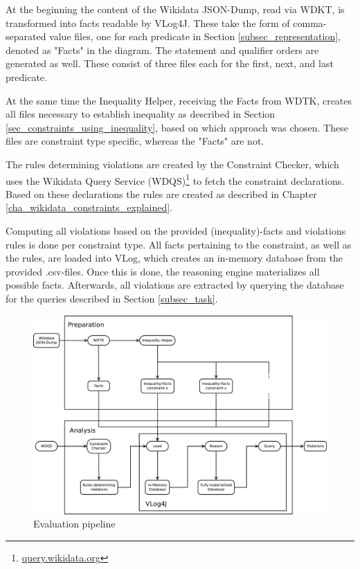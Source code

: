 \documentclass[hyperref,bachelorofscience,fleqn]{cgvpub}
\begin{document}
At the beginning the content of the Wikidata JSON-Dump, read via WDKT, is transformed into facts readable by VLog4J. These take the form of comma-separated value files, one for each predicate in Section \ref{subsec_representation}, denoted as "Facts" in the diagram. The statement and qualifier orders are generated as well. These consist of three files each for the first, next, and last predicate.

At the same time the Inequality Helper, receiving the Facts from WDTK, creates all files necessary to establish inequality as described in Section \ref{sec_constraints_using_inequality}, based on which approach was chosen. These files are constraint type specific, whereas the "Facts" are not.

The rules determining violations are created by the Constraint Checker, which uses the Wikidata Query Service (WDQS)\footnote{\url{query.wikidata.org}} to fetch the constraint declarations. Based on these declarations the rules are created as described in Chapter \ref{cha_wikidata_constraints_explained}.

Computing all violations based on the provided (inequality)-facts and violations rules is done per constraint type. All facts pertaining to the constraint, as well as the rules, are loaded into VLog, which creates an in-memory database from the provided .csv-files. Once this is done, the reasoning engine materializes all possible facts. Afterwards, all violations are extracted by querying the database for the queries described in Section \ref{subsec_task}.

\begin{figure}
\includegraphics[width=\linewidth]{images/Pipeline.pdf}
\caption{Evaluation pipeline}\label{fig_pipeline}
\end{figure}
\end{document}
